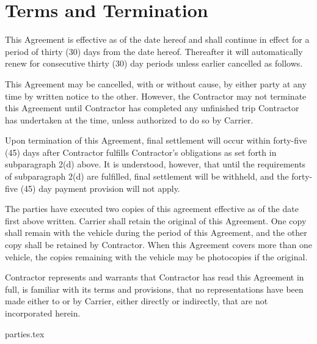 \section{Terms and Termination}
{
    \setlength{\parskip}{\baselineskip}
    \setlength{\parindent}{0pt}

    This Agreement is effective as of the date hereof and shall continue in
    effect for a period of thirty (30) days from the date hereof.
    Thereafter it will automatically renew for consecutive thirty (30) day
    periods unless earlier cancelled as follows.

    This Agreement may be cancelled, with or without cause, by either party
    at any time by written notice to the other. However, the Contractor may
    not terminate this Agreement until Contractor has completed any
    unfinished trip Contractor has undertaken at the time, unless
    authorized to do so by Carrier.

    Upon termination of this Agreement, final settlement will occur within
    forty-five (45) days after Contractor fulfills Contractor's obligations
    as set forth in subparagraph 2(d) above. It is understood, however,
    that until the requirements of subparagraph 2(d) are fulfilled, final
    settlement will be withheld, and the forty-five (45) day payment
    provision will not apply.

    The parties have executed two copies of this agreement effective as of
    the date first above written. Carrier shall retain the original of this
    Agreement. One copy shall remain with the vehicle during the period of
    this Agreement, and the other copy shall be retained by Contractor.
    When this Agreement covers more than one vehicle, the copies remaining
    with the vehicle may be photocopies if the original.

    Contractor represents and warrants that Contractor has read this
    Agreement in full, is familiar with its terms and provisions, that no
    representations have been made either to or by Carrier, either directly
    or indirectly, that are not incorporated herein.
}
{parties.tex}